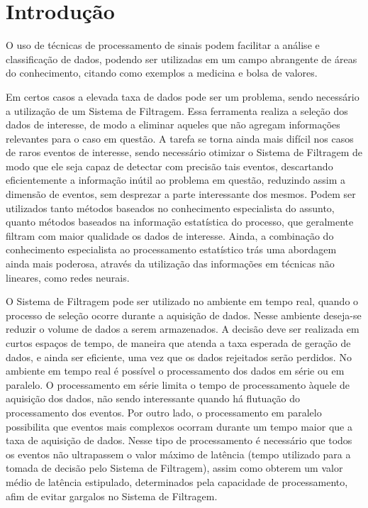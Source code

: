 \chapter{Introdução}
\label{cap:intro}
\glsresetall

O uso de técnicas de processamento de sinais podem facilitar a análise e
classificação de dados, podendo ser utilizadas em um campo abrangente de áreas
do conhecimento, citando como exemplos a medicina e bolsa de valores.

Em certos casos a elevada taxa de dados pode ser um problema, sendo necessário a
utilização de um Sistema de Filtragem. Essa ferramenta realiza a seleção dos dados 
de interesse, de modo a eliminar aqueles que não agregam informações relevantes 
para o caso em questão. A tarefa se torna ainda mais difícil nos casos de raros
eventos de interesse, sendo necessário otimizar o Sistema de Filtragem de modo que 
ele seja capaz de detectar com precisão tais eventos, descartando eficientemente a 
informação inútil ao problema em questão, reduzindo assim a dimensão 
de eventos, sem desprezar a parte interessante dos mesmos.
Podem ser utilizados tanto métodos baseados no conhecimento especialista do
assunto, quanto métodos baseados na informação estatística do processo, 
que geralmente filtram com maior qualidade os dados de interesse. Ainda, 
a combinação do conhecimento especialista ao processamento 
estatístico trás uma abordagem ainda mais poderosa, através da utilização das informações 
em técnicas não lineares, como redes neurais.

O Sistema de Filtragem pode ser utilizado no ambiente em tempo real,
quando o processo de seleção ocorre durante a aquisição de dados. Nesse ambiente
deseja-se reduzir o volume de dados a serem armazenados. A decisão deve ser realizada 
em curtos espaços de tempo, de maneira que atenda a taxa esperada de geração de
dados, e ainda ser eficiente, uma vez que os dados rejeitados serão perdidos. 
No ambiente em tempo real é possível o processamento dos dados em série
ou em paralelo. O processamento em série limita o tempo de processamento àquele
de aquisição dos dados, não sendo interessante quando há flutuação do
processamento dos eventos. Por outro lado, o processamento em
paralelo possibilita que eventos mais complexos ocorram durante um tempo maior
que a taxa de aquisição de dados. Nesse tipo de processamento é necessário que
todos os eventos não ultrapassem o valor máximo de latência (tempo utilizado
para a tomada de decisão pelo Sistema de Filtragem), assim como obterem um valor 
médio de latência estipulado, determinados pela capacidade de processamento,
afim de evitar gargalos no Sistema de Filtragem.

